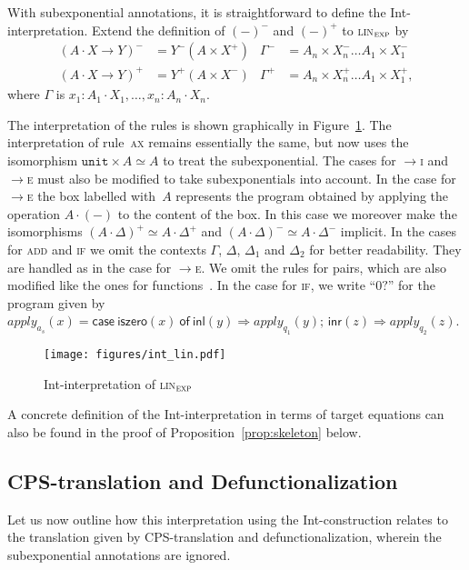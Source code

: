 \documentclass{LMCS}
\theoremstyle{definition}
\theoremstyle{plain}
\newcommand{\lolli}[3]{#1\cdot #2 \to #3}
\newcommand{\kw}[1]{\mathsf{#1}}
\newcommand{\unit}{\mathtt{unit}}
\newcommand{\Capply}{\textit{apply}}
\newcommand{\J}[3]{#1 \colon #2 \cdot #3}
\newcommand{\R}[1]{\textsc{#1}}
\newcommand{\tcase}[5]{\kw{case}\ #1\ \kw{of}\ \kw{inl}(#2) \Rightarrow #3;\, \kw{inr}(#4) \Rightarrow #5}
\newcommand{\iso}{\simeq}
\newcommand{\linexp}{\textsc{lin}$_\textsc{exp}$\xspace}
\begin{document}
With subexponential annotations, it is straightforward to define
the Int-interpretation.
Extend the definition of $(-)^-$ and $(-)^+$ to \linexp
by 
\begin{align*}
  (\lolli A X Y)^- &= Y^- (A\times X^+) 
  &
  \Gamma^- &= A_n\times X^-_n\dots A_1\times X^-_1
  \\
  (\lolli A X Y)^+ &= Y^+ (A\times X^-)
  &
  \Gamma^+ &= A_n\times X^+_n\dots A_1\times X^+_1,
\end{align*}
where $\Gamma$ is
$\J {x_1} {A_1} {X_1},\dots,\J {x_n} {A_n} {X_n}$.

The interpretation of the rules is shown graphically in
Figure~\ref{fig:intlin}.
The interpretation of rule~\R{ax} remains essentially the same,
but now uses the isomorphism $\unit \times A \iso A$ to treat the
subexponential.
The cases for \R{$\to$i} and \R{$\to$e} must also be modified 
to take subexponentials into account. In the case for \R{$\to$e} 
the box labelled with~$A$ represents the
program obtained by applying the operation $A\cdot (-)$
to the content of the box.  
In this case we moreover make the isomorphisms 
$(A\cdot \Delta)^+ \iso A\cdot \Delta^+$ 
and
$(A\cdot \Delta)^- \iso A\cdot \Delta^-$ 
implicit.
In the cases for \R{add} and \R{if} we omit the contexts
$\Gamma$, $\Delta$, $\Delta_1$ and $\Delta_2$ for better readability.
They are handled as in the case for \R{$\to$e}.
We omit the rules for pairs, which are also modified like the ones for 
functions~\cite{intml}.
In the case for \R{if}, we write ``$0?$'' for the program given by
$\Capply_{a_s}(x) = \tcase{\kw{iszero}(x)}{y}{\Capply_{q_1}(y)}{z}{\Capply_{q_2}(z)}$.
\begin{figure}
\begin{center}
  \texttt{[image: figures/int\_lin.pdf]}
\end{center}
\caption{Int-interpretation of \linexp}
\label{fig:intlin}
\end{figure}
A concrete definition of the Int-interpretation in terms of 
target equations can also be found in the proof of
Proposition~\ref{prop:skeleton} below.

\subsection{CPS-translation and Defunctionalization}

Let us now outline how this interpretation using the Int-construction relates to the
translation given by CPS-translation and defunctionalization, 
wherein the subexponential annotations are ignored.
\end{document}
